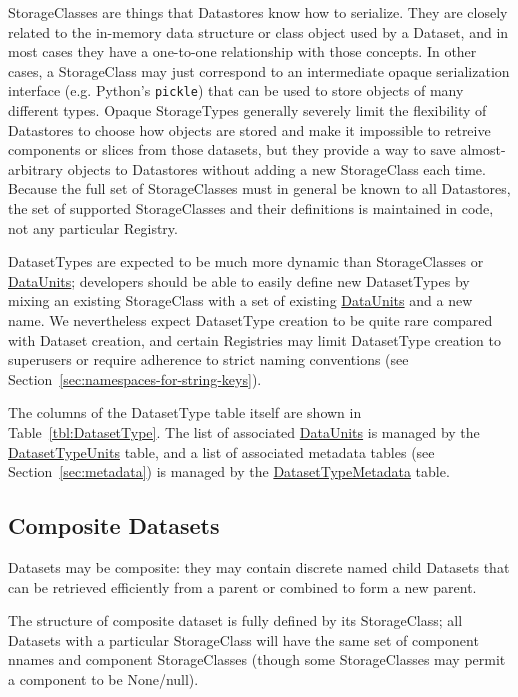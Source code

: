 \documentclass[DM,toc]{lsstdoc}
\newcommand{\tblref}[1]{\hyperref[tbl:#1]{#1}}
\newcommand{\coltable}[1]{
    \begin{table}[htb]
        {
            \footnotesize
            
        }
        \caption{#1 Columns}
        \label{tbl:#1}
    \end{table}
}
\begin{document}
StorageClasses are things that Datastores know how to serialize.
They are closely related to the in-memory data structure or class object used by a Dataset, and in most cases they have a one-to-one relationship with those concepts.
In other cases, a StorageClass may just correspond to an intermediate opaque serialization interface (e.g. Python's \texttt{pickle}) that can be used to store objects of many different types.
Opaque StorageTypes generally severely limit the flexibility of Datastores to choose how objects are stored and make it impossible to retreive components or slices from those datasets, but they provide a way to save almost-arbitrary objects to Datastores without adding a new StorageClass each time.
Because the full set of StorageClasses must in general be known to all Datastores, the set of supported StorageClasses and their definitions is maintained in code, not any particular Registry.

DatasetTypes are expected to be much more dynamic than StorageClasses or \hyperref[sec:dataunits]{DataUnits}; developers should be able to easily define new DatasetTypes by mixing an existing StorageClass with a set of existing \hyperref[sec:dataunits]{DataUnits} and a new name.
We nevertheless expect DatasetType creation to be quite rare compared with Dataset creation, and certain Registries may limit DatasetType creation to superusers or require adherence to strict naming conventions (see Section~\ref{sec:namespaces-for-string-keys}).

The columns of the DatasetType table itself are shown in Table~\ref{tbl:DatasetType}.
The list of associated \hyperref[sec:dataunits]{DataUnits} is managed by the \tblref{DatasetTypeUnits} table, and a list of associated metadata tables (see Section~\ref{sec:metadata}) is managed by the \tblref{DatasetTypeMetadata} table.

\coltable{DatasetType}
\coltable{DatasetTypeUnits}
\coltable{DatasetTypeMetadata}


\subsection{Composite Datasets}
\label{sec:composite-datasets}

Datasets may be composite: they may contain discrete named child Datasets that can be retrieved efficiently from a parent or combined to form a new parent.

The structure of composite dataset is fully defined by its StorageClass; all Datasets with a particular StorageClass will have the same set of component nnames and component StorageClasses (though some StorageClasses may permit a component to be None/null).
\end{document}
